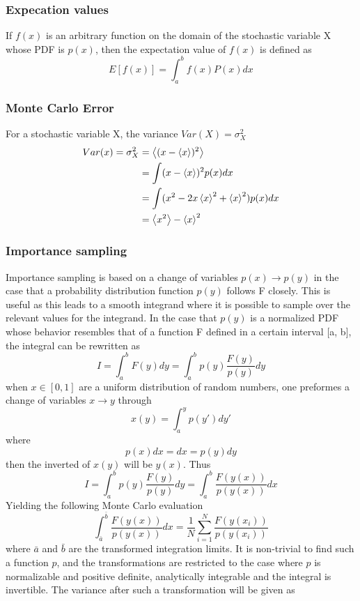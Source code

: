 \documentclass[%
reprint,
amsmath,amssymb,
aps,
]{revtex4-1}
\begin{document}
\subsubsection{Expecation values}
If $f(x)$ is an arbitrary function on the domain of the stochastic variable X whose PDF is $p(x)$, then the expectation value of $f(x)$ is defined as 
\begin{equation}
	E[f(x)] = \int_{a}^{b}f(x)P(x)dx 
\end{equation}

\subsubsection{Monte Carlo Error}
For a stochastic variable X, the variance $Var(X) = \sigma_X^2 $
\begin{align*}
	Var(x) = \sigma_X^2 &= \expval{(x-\expval{x})^2} \\
	&= \int(x-\expval{x})^2p(x)dx\\
	&= \int(x^2-2x\expval{x}^2+ \expval{x}^2)p(x)dx\\
	& = \expval{x^2} - \expval{x}^2
\end{align*}

\subsubsection{Importance sampling}
Importance sampling is based on a change of variables $p(x)\rightarrow p(y)$ in the case that a probability distribution function $p(y)$ follows F closely. This is useful as this leads to a smooth integrand where it is possible to sample over the relevant values for the integrand. In the case that $p(y)$ is a normalized PDF whose behavior resembles that of a function F defined in a certain interval [a, b], the integral can be rewritten as 
\begin{equation}
	I = \int_{a}^{b}F(y)dy = \int_{a}^{b}p(y)\dfrac{F(y)}{p(y)}dy 
\end{equation}
when $x\in[0,1]$ are a uniform distribution of random numbers, one preformes a change of variables $x\rightarrow y$ through
\begin{equation}
	x(y) = \int_{a}^{y}p(y')dy'
\end{equation}
where
\begin{equation}
	p(x)dx = dx = p(y)dy
\end{equation}
then the inverted of $x(y)$ will be $y(x)$. Thus
\begin{equation}
I = \int_{a}^{b}p(y)\dfrac{F(y)}{p(y)}dy  = \int_{a}^{b}\dfrac{F(y(x))}{p(y(x))}dx
\end{equation}
Yielding the following Monte Carlo evaluation 
\begin{equation}
	\int_{\bar{a}}^{\bar{b}}\dfrac{F(y(x))}{p(y(x))}dx = \dfrac{1}{N}\sum_{i=1}^{N}\dfrac{F(y(x_i))}{p(y(x_i))}
\end{equation}
where $\bar{a}$ and $\bar{b}$ are the transformed integration limits. It is non-trivial to find such a function $p$, and the transformations are restricted to the case where $p$ is normalizable and positive definite, analytically integrable and the integral is invertible. The variance after such a transformation will be given as 
\end{document}
